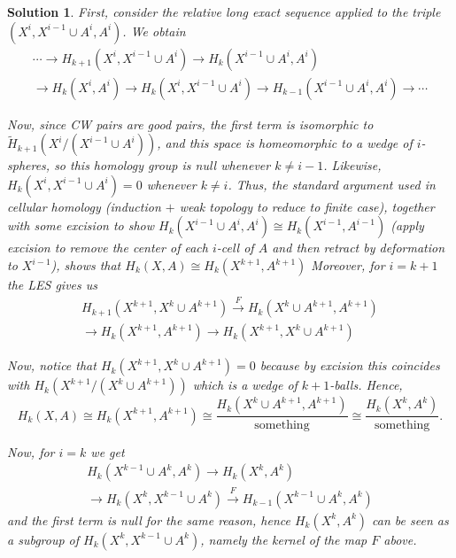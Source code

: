 \documentclass{article}
\theoremstyle{plain}
\theoremstyle{nonumberplain}
\newtheorem{sol}{Solution}
\begin{document}
\begin{sol}
First, consider the relative long exact sequence applied to the triple $(X^i, X^{i-1} \cup A^i, A^i)$. We obtain
\begin{multline}
\cdots \to H_{k+1}(X^i, X^{i-1} \cup A^i) \to H_k(X^{i-1} \cup A^i, A^i) \\\to H_k(X^i, A^i) \to H_{k}(X^i, X^{i-1} \cup A^i) \to H_{k-1}(X^{i-1} \cup A^i, A^i) \to \cdots
\end{multline}

Now, since CW pairs are good pairs, the first term is isomorphic to $\tilde H_{k+1}(X^i / (X^{i-1} \cup A^i))$, and this space is homeomorphic to a wedge of $i$-spheres, so this homology group is null whenever $k \neq i-1$. Likewise, $H_k(X^i, X^{i-1} \cup A^i) = 0$ whenever $k \neq i$. Thus, the standard argument used in cellular homology (induction $+$ weak topology to reduce to finite case), together with some excision to show $H_k(X^{i-1} \cup A^i, A^i) \cong H_k(X^{i-1}, A^{i-1})$ (apply excision to remove the center of each $i$-cell of $A$ and then retract by deformation to $X^{i-1}$), shows that $H_k(X,A) \cong H_k(X^{k+1}, A^{k+1})$ Moreover, for $i = k+1$ the LES gives us
\begin{equation}\label{eq:les1}
\begin{multlined}
H_{k+1}(X^{k+1}, X^{k} \cup A^{k+1}) \xrightarrow{F} H_{k}(X^{k} \cup A^{k+1}, A^{k+1}) \\\to H_{k}(X^{k+1}, A^{k+1}) \to H_{k}(X^{k+1}, X^{k} \cup A^{k+1})
\end{multlined}
\end{equation}

Now, notice that $H_k(X^{k+1}, X^k \cup A^{k+1}) = 0$ because by excision this coincides with $H_k(X^{k+1} / (X^k \cup A^{k+1}))$ which is a wedge of $k+1$-balls. Hence,
\begin{equation}
H_k(X,A) \cong H_k(X^{k+1}, A^{k+1}) \cong \frac{H_k(X^k \cup A^{k+1}, A^{k+1})}{\text{something}} \cong \frac{H_k(X^k, A^{k})}{\text{something}}.
\end{equation}

Now, for $i = k$ we get
\begin{equation}
\begin{multlined}
H_{k}(X^{k-1} \cup A^{k}, A^{k}) \to H_{k}(X^{k}, A^{k})\\\to H_{k}(X^{k}, X^{k-1} \cup A^{k}) \xrightarrow{F} H_{k-1}(X^{k-1} \cup A^k, A^k)
\end{multlined}
\end{equation}
and the first term is null for the same reason, hence $H_k(X^k, A^k)$ can be seen as a subgroup of $H_k(X^k, X^{k-1} \cup A^k)$, namely the kernel of the map $F$ above.


\end{sol}
\end{document}
